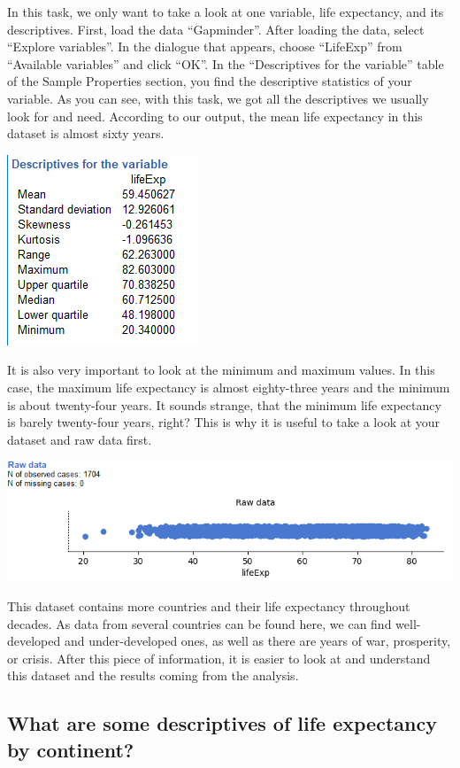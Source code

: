 \documentclass[
]{book}
\begin{document}
In this task, we only want to take a look at one variable, life expectancy, and its descriptives. First, load the data ``Gapminder''. After loading the data, select ``Explore variables''. In the dialogue that appears, choose ``LifeExp'' from ``Available variables'' and click ``OK''. In the ``Descriptives for the variable'' table of the Sample Properties section, you find the descriptive statistics of your variable. As you can see, with this task, we got all the descriptives we usually look for and need. According to our output, the mean life expectancy in this dataset is almost sixty years.

\includegraphics{img/ch2/descriptives.png}

It is also very important to look at the minimum and maximum values. In this case, the maximum life expectancy is almost eighty-three years and the minimum is about twenty-four years. It sounds strange, that the minimum life expectancy is barely twenty-four years, right? This is why it is useful to take a look at your dataset and raw data first.

\includegraphics{img/ch2/rawdata.png}

This dataset contains more countries and their life expectancy throughout decades. As data from several countries can be found here, we can find well-developed and under-developed ones, as well as there are years of war, prosperity, or crisis. After this piece of information, it is easier to look at and understand this dataset and the results coming from the analysis.

\hypertarget{what-are-some-descriptives-of-life-expectancy-by-continent}{%
\subsection{What are some descriptives of life expectancy by continent?}\label{what-are-some-descriptives-of-life-expectancy-by-continent}}
\end{document}
